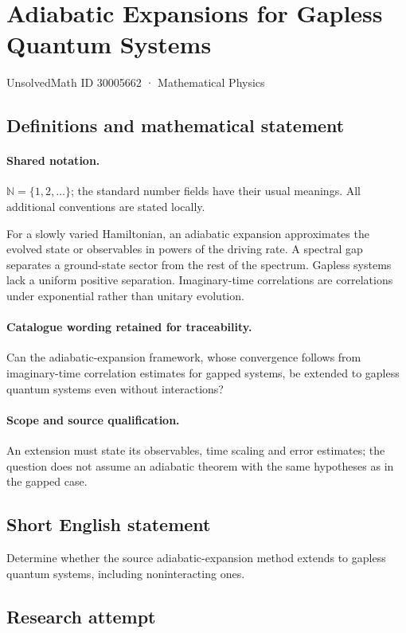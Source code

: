 \documentclass[11pt]{article}
\begin{document}
\setcounter{section}{30005661}
\section{Adiabatic Expansions for Gapless Quantum Systems}\label{30005662}
{\small UnsolvedMath ID 30005662 · Mathematical Physics}
\subsection{Definitions and mathematical statement}

\paragraph{Shared notation.}$\mathbb N=\{1,2,\ldots\}$; the standard number fields have their usual meanings. All additional conventions are stated locally.


For a slowly varied Hamiltonian, an adiabatic expansion approximates the evolved state or observables in powers of the driving rate. A spectral gap separates a ground-state sector from the rest of the spectrum. Gapless systems lack a uniform positive separation. Imaginary-time correlations are correlations under exponential rather than unitary evolution.

\paragraph{Catalogue wording retained for traceability.}
Can the adiabatic-expansion framework, whose convergence follows from imaginary-time correlation estimates for gapped systems, be extended to gapless quantum systems even without interactions?

\paragraph{Scope and source qualification.}An extension must state its observables, time scaling and error estimates; the question does not assume an adiabatic theorem with the same hypotheses as in the gapped case.
\subsection{Short English statement}
Determine whether the source adiabatic-expansion method extends to gapless quantum systems, including noninteracting ones.
\subsection{Research attempt}
\end{document}
